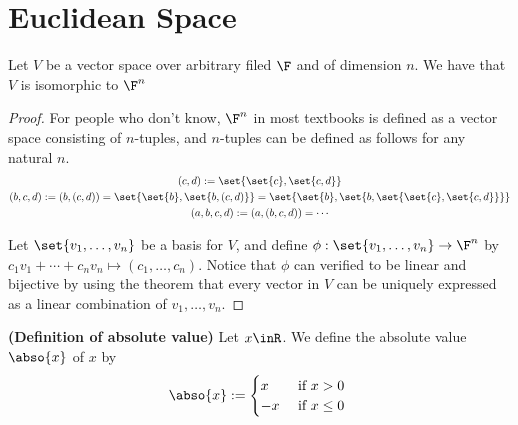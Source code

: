 \documentclass{report}
\begin{document}
\section{Euclidean Space}
\begin{theorem}
\label{1.5.1}
Let $V$ be a vector space over arbitrary filed $\F$ and of dimension $n$. We have that  $V$ is isomorphic to  $\F^n$  
\end{theorem}
\begin{proof}
For people who don't know, $\F^n$ in most textbooks is defined as a vector space consisting of $n$-tuples, and $n$-tuples can be defined as follows for any natural $n$.\\

 \begin{gather*}
   (c,d):=\set{\set{c},\set{c,d}}\\
   (b,c,d):=(b,(c,d))=\set{\set{b},\set{b,(c,d)}}=\set{\set{b},\set{b,\set{\set{c},\set{c,d}}}}\\
   (a,b,c,d):=(a,(b,c,d))=\cdots 
\end{gather*}


  Let $\set{v_1,\dots,v_n}$ be a basis for $V$, and define $\phi: \set{v_1,\dots ,v_n} \rightarrow \F^n$ by $c_1v_1+\cdots+c_nv_n\mapsto (c_1,\dots,c_n)$. Notice that $\phi$ can verified to be linear and bijective by using the theorem that every vector in $V$ can be uniquely expressed as a linear combination of  $v_1,\dots ,v_n$.  
\end{proof}
\begin{definition}
\label{1.5.2}
\textbf{(Definition of absolute value)} Let $x\inR$. We define the absolute value $\abso{x}$ of $x$ by
\begin{equation*}
\abso{x}:=\begin{cases}
  x & \text{ if $x>0$ }\\
  -x& \text{ if $x\leq 0$  }
\end{cases} 
\end{equation*}
\end{definition}
\end{document}
